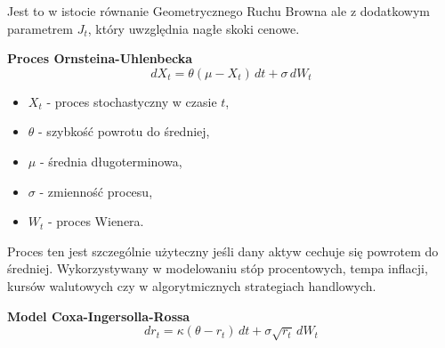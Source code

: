 Jest to w istocie równanie Geometrycznego Ruchu Browna ale z dodatkowym parametrem \( J_t \), który uwzględnia nagłe skoki cenowe.
    \item \textbf{Proces Ornsteina-Uhlenbecka}
    \begin{equation}
dX_t = \theta (\mu - X_t) \, dt + \sigma \, dW_t
\end{equation}
\begin{itemize}
  \item \( X_t \) - proces stochastyczny w czasie \( t \),
  \item \( \theta \) - szybkość powrotu do średniej,
  \item \( \mu \) - średnia długoterminowa,
  \item \( \sigma \) - zmienność procesu,
  \item \( W_t \) - proces Wienera.
\end{itemize}
Proces ten jest szczególnie użyteczny jeśli dany aktyw cechuje się powrotem do średniej. Wykorzystywany w modelowaniu stóp procentowych, tempa inflacji, kursów walutowych czy w algorytmicznych strategiach handlowych. 
    \item \textbf{Model Coxa-Ingersolla-Rossa}
    \begin{equation}
dr_t = \kappa (\theta - r_t) \, dt + \sigma \sqrt{r_t} \, dW_t
\end{equation}

